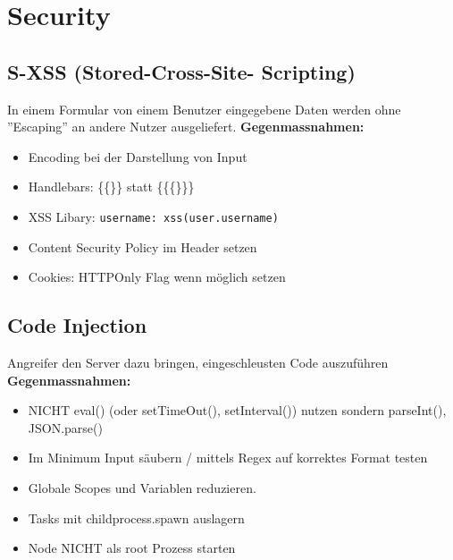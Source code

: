 
\section{Security}


\subsection{S-XSS (Stored-Cross-Site- Scripting)}
In einem Formular von einem Benutzer eingegebene Daten werden ohne ''Escaping'' an andere Nutzer ausgeliefert.
\textbf{Gegenmassnahmen:}
\begin{itemize}
    \item Encoding bei der Darstellung von Input
    \item Handlebars: \{\{\}\} statt \{\{\{\}\}\}
    \item XSS Libary: \texttt{username: xss(user.username)}
    \item Content Security Policy im Header setzen
    \item Cookies: HTTPOnly Flag wenn möglich setzen
\end{itemize}


\subsection{Code Injection}
Angreifer den Server dazu bringen, eingeschleusten Code auszuführen
\textbf{Gegenmassnahmen:}
\begin{itemize}
    \item NICHT eval() (oder setTimeOut(), setInterval()) nutzen sondern parseInt(), JSON.parse()
    \item Im Minimum Input säubern / mittels Regex auf korrektes Format testen
    \item Globale Scopes und Variablen reduzieren.
    \item Tasks mit childprocess.spawn auslagern
    \item Node NICHT als root Prozess starten
\end{itemize}


